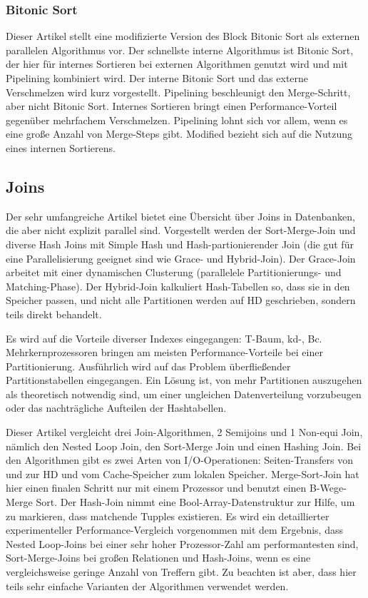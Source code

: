 \documentclass[a4paper,12pt,twoside]{article}
\begin{document}
\subsubsection{Bitonic Sort}
\textbf{}

Dieser Artikel stellt eine modifizierte Version des Block Bitonic Sort als externen parallelen Algorithmus vor. Der schnellste interne Algorithmus ist Bitonic Sort, der hier für internes Sortieren bei externen Algorithmen genutzt wird und mit Pipelining kombiniert wird. Der interne Bitonic Sort und das externe Verschmelzen wird kurz vorgestellt. Pipelining beschleunigt den Merge-Schritt, aber nicht Bitonic Sort. Internes Sortieren bringt einen Performance-Vorteil gegenüber mehrfachem Verschmelzen. Pipelining lohnt sich vor allem, wenn es eine große Anzahl von Merge-Steps gibt. Modified bezieht sich auf die Nutzung eines internen Sortierens. 

\subsection{Joins}
\textbf{}

Der sehr umfangreiche Artikel bietet eine Übersicht über Joins in Datenbanken, die aber nicht explizit parallel sind. Vorgestellt werden der Sort-Merge-Join und diverse Hash Joins mit Simple Hash und Hash-partionierender Join (die gut für eine Parallelisierung geeignet sind wie Grace- und Hybrid-Join). Der Grace-Join arbeitet mit einer dynamischen Clusterung (parallelele Partitionierungs- und Matching-Phase). Der Hybrid-Join kalkuliert Hash-Tabellen so, dass sie in den Speicher passen, und nicht alle Partitionen werden auf HD geschrieben, sondern teils direkt behandelt.

Es wird auf die Vorteile diverser Indexes eingegangen: T-Baum, kd-, Bc. Mehrkernprozessoren bringen am meisten Performance-Vorteile bei einer Partitionierung. Ausführlich wird auf das Problem überfließender Partitionstabellen eingegangen. Ein Lösung ist, von mehr Partitionen auszugehen als theoretisch notwendig sind, um einer ungleichen Datenverteilung vorzubeugen oder das nachträgliche Aufteilen der Hashtabellen.

\textbf{}

Dieser Artikel vergleicht drei Join-Algorithmen, 2 Semijoins und 1 Non-equi Join, nämlich den Nested Loop Join, den Sort-Merge Join und einen Hashing Join. Bei den Algorithmen gibt es zwei Arten von I/O-Operationen: Seiten-Transfers von und zur HD und vom Cache-Speicher zum lokalen Speicher. Merge-Sort-Join hat hier einen finalen Schritt nur mit einem Prozessor und benutzt einen B-Wege-Merge Sort. Der Hash-Join nimmt eine Bool-Array-Datenstruktur zur Hilfe, um zu markieren, dass matchende Tupples existieren. Es wird ein detaillierter experimenteller Performance-Vergleich vorgenommen mit dem Ergebnis, dass Nested Loop-Joins bei einer sehr hoher Prozessor-Zahl am performantesten sind, Sort-Merge-Joins bei großen Relationen und Hash-Joins, wenn es eine vergleichsweise geringe Anzahl von Treffern gibt. Zu beachten ist aber, dass hier teils sehr einfache Varianten der Algorithmen verwendet werden.
\end{document}
